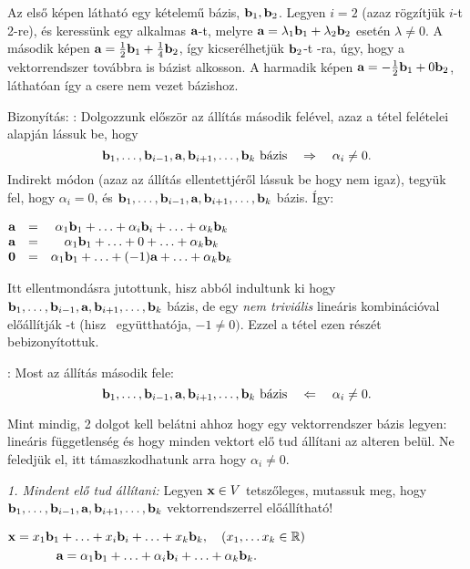 \documentclass[a4paper,11.5pt]{article}
\begin{document}
	{\centering Az első képen látható egy kételemű bázis, $\textbf{b}_1,\textbf{b}_2$. Legyen $i=2$ (azaz rögzítjük $i$-t 2-re), és keressünk egy alkalmas $\textbf{a}$-t, melyre $\textbf{a}=\lambda_1\textbf{b}_1+\lambda_2\textbf{b}_2$ esetén $\lambda \not=0$. A második képen $\textbf{a}=\frac{1}{2}\textbf{b}_1+\frac{1}{4}\textbf{b}_2$, így kicserélhetjük $\textbf{b}_2$-t \a-ra, úgy, hogy a vektorrendszer továbbra is bázist alkosson. A harmadik képen $\textbf{a}=-\frac{1}{2}\textbf{b}_1+0\textbf{b}_2$, láthatóan így a csere nem vezet bázishoz. \par}	
	
	\medskip
	Bizonyítás: \fbox{$\Rightarrow$}: Dolgozzunk először az állítás második felével, azaz a tétel felételei alapján lássuk be, hogy \[\textbf{b}_1,\ldots,\textbf{b}_{i-1},\textbf{a},\textbf{b}_{i+1},\ldots,\textbf{b}_k \text{ bázis} \quad\Rightarrow \quad \alpha_i\not=0.\]
	Indirekt módon (azaz az állítás ellentettjéről lássuk be hogy nem igaz), tegyük fel, hogy $\alpha_i=0$, és $\textbf{b}_1,\ldots,\textbf{b}_{i-1},\textbf{a},\textbf{b}_{i+1},\ldots,\textbf{b}_k$ bázis. Így:
	
	\begin{center}
		$\begin{matrix}
			\textbf{a}&=&\alpha_1\textbf{b}_1+\ldots+\alpha_i\textbf{b}_i+\ldots+\alpha_k\textbf{b}_k\\
			\textbf{a}&=&\alpha_1\textbf{b}_1+\ldots+0+\ldots+\alpha_k\textbf{b}_k\\
			\textbf{0}&=&\alpha_1\textbf{b}_1+\ldots+(-1)\textbf{a}+\ldots+\alpha_k\textbf{b}_k
		\end{matrix}$
	\end{center}
	
	Itt ellentmondásra jutottunk, hisz abból indultunk ki hogy $\textbf{b}_1,\ldots,\textbf{b}_{i-1},\textbf{a},\textbf{b}_{i+1},\ldots,\textbf{b}_k$ bázis, de egy \emph{nem triviális} lineáris kombinációval előállítják \0-t (hisz \a\  együtthatója, $-1\not=0)$. Ezzel a tétel ezen részét bebizonyítottuk.
	
	\medskip
	\fbox{$\Leftarrow$}: Most az állítás második fele:
	\[\textbf{b}_1,\ldots,\textbf{b}_{i-1},\textbf{a},\textbf{b}_{i+1},\ldots,\textbf{b}_k \text{ bázis} \quad\Leftarrow \quad \alpha_i\not=0.\]
	
	Mint mindig, 2 dolgot kell belátni ahhoz hogy egy vektorrendszer bázis legyen: lineáris függetlenség és hogy minden vektort elő tud állítani az alteren belül. Ne feledjük el, itt támaszkodhatunk arra hogy $\alpha_i\not=0$.
	
	\smallskip
	\emph{1. Mindent elő tud állítani:} Legyen $\textbf{x} \in V$ tetszőleges, mutassuk meg, hogy $\textbf{b}_1,\ldots,\textbf{b}_{i-1},\textbf{a},\textbf{b}_{i+1},\ldots,\textbf{b}_k$ vektorrendszerrel előállítható!
	
	\begin{center}
		$\begin{gathered}
			\textbf{x}=x_1\textbf{b}_1+\ldots+x_i\textbf{b}_i+\ldots+ x_k\textbf{b}_k,\quad (x_1,\ldots x_k\in\mathbb{R})\\
			\textbf{a} = \alpha_1\textbf{b}_1+\ldots+\alpha_i\textbf{b}_i+\ldots+\alpha_k\textbf{b}_k.\\
		\end{gathered}$
	\end{center}
	
\end{document}
